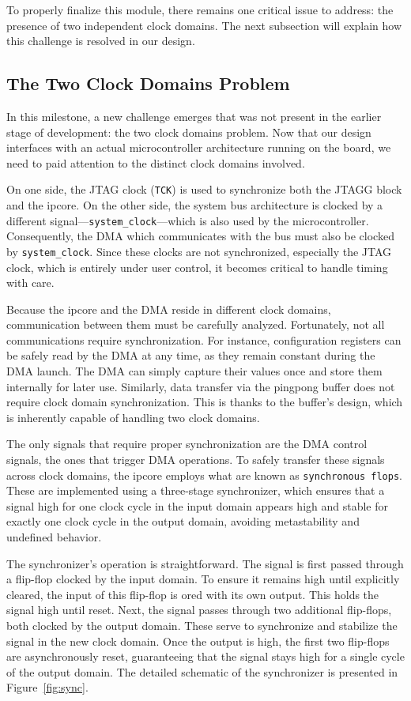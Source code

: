 \documentclass[a4paper,11pt,oneside]{report}
\begin{document}
To properly finalize this module, there remains one critical issue to address:
the presence of two independent clock domains. 
The next subsection will explain how this challenge is resolved in our design.

\subsection{The Two Clock Domains Problem}

In this milestone, a new challenge emerges that was not present in the earlier stage of development: the two clock domains problem. 
Now that our design interfaces with an actual microcontroller architecture running on the board, 
we need to paid attention to the distinct clock domains involved.

On one side, the JTAG clock (\texttt{TCK}) is used to synchronize both the JTAGG block and the ipcore. 
On the other side, the system bus architecture is clocked by a different signal—\texttt{system\_clock}—which is also used by the microcontroller. 
Consequently, the DMA which communicates with the bus must also be clocked by \texttt{system\_clock}. 
Since these clocks are not synchronized, especially the JTAG clock, which is entirely under user control, it becomes critical to handle timing with care.

Because the ipcore and the DMA reside in different clock domains, communication between them must be carefully analyzed. 
Fortunately, not all communications require synchronization. For instance, configuration registers can be safely read by the DMA at any time, 
as they remain constant during the DMA launch. The DMA can simply capture their values once and store them internally for later use.
Similarly, data transfer via the pingpong buffer does not require clock domain synchronization. 
This is thanks to the buffer's design, which is inherently capable of handling two clock domains.

The only signals that require proper synchronization are the DMA control signals, the ones that trigger DMA operations. 
To safely transfer these signals across clock domains, the ipcore employs what are known as \texttt{synchronous flops}. 
These are implemented using a three-stage synchronizer, which ensures that a signal high for one clock cycle in the input domain 
appears high and stable for exactly one clock cycle in the output domain, avoiding metastability and undefined behavior.

The synchronizer's operation is straightforward. The signal is first passed through a flip-flop clocked by the input domain. 
To ensure it remains high until explicitly cleared, the input of this flip-flop is ored with its own output. 
This holds the signal high until reset.
Next, the signal passes through two additional flip-flops, both clocked by the output domain. 
These serve to synchronize and stabilize the signal in the new clock domain. 
Once the output is high, the first two flip-flops are asynchronously reset, 
guaranteeing that the signal stays high for a single cycle of the output domain.
The detailed schematic of the synchronizer is presented in Figure~\ref{fig:sync}.
\end{document}
